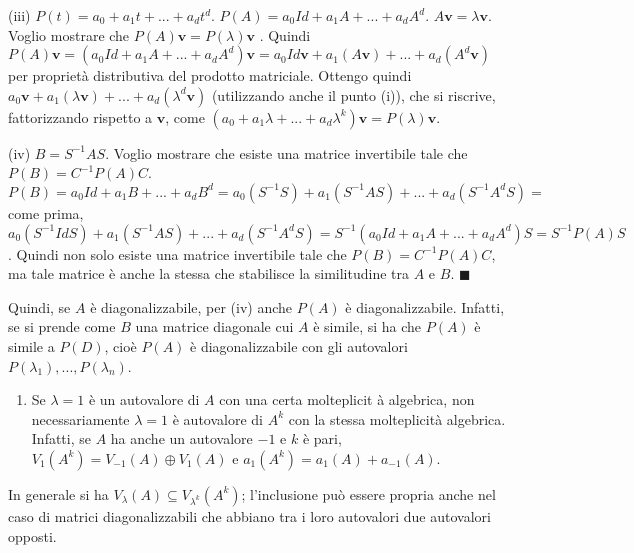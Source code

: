 \documentclass{article}
\begin{document}
(iii) $P\left( t\right) =a_{0}+a_{1}t+...+a_{d}t^{d}$. $P\left( A\right)
=a_{0}Id+a_{1}A+...+a_{d}A^{d}$. $A\mathbf{v=}\lambda \mathbf{v}$. Voglio
mostrare che $P\left( A\right) \mathbf{v}=P\left( \lambda \right) \mathbf{v}$%
. Quindi $P\left( A\right) \mathbf{v}=\left(
a_{0}Id+a_{1}A+...+a_{d}A^{d}\right) \mathbf{v}=a_{0}Id\mathbf{v}%
+a_{1}\left( A\mathbf{v}\right) +...+a_{d}\left( A^{d}\mathbf{v}\right) $
per propriet\`{a} distributiva del prodotto matriciale. Ottengo quindi $a_{0}%
\mathbf{v}+a_{1}\left( \lambda \mathbf{v}\right) +...+a_{d}\left( \lambda
^{d}\mathbf{v}\right) $ (utilizzando anche il punto (i)), che si riscrive,
fattorizzando rispetto a $\mathbf{v}$, come $\left( a_{0}+a_{1}\lambda
+...+a_{d}\lambda ^{k}\right) \mathbf{v}=P\left( \lambda \right) \mathbf{v}$.

(iv) $B=S^{-1}AS$. Voglio mostrare che esiste una matrice invertibile tale
che $P\left( B\right) =C^{-1}P\left( A\right) C$. $P\left( B\right)
=a_{0}Id+a_{1}B+...+a_{d}B^{d}=a_{0}\left( S^{-1}S\right) +a_{1}\left(
S^{-1}AS\right) +...+a_{d}\left( S^{-1}A^{d}S\right) =$ come prima, $%
a_{0}\left( S^{-1}IdS\right) +a_{1}\left( S^{-1}AS\right) +...+a_{d}\left(
S^{-1}A^{d}S\right) =S^{-1}\left( a_{0}Id+a_{1}A+...+a_{d}A^{d}\right)
S=S^{-1}P\left( A\right) S$. Quindi non solo esiste una matrice invertibile
tale che $P\left( B\right) =C^{-1}P\left( A\right) C$, ma tale matrice \`{e}
anche la stessa che stabilisce la similitudine tra $A$ e $B$. $\blacksquare $

Quindi, se $A$ \`{e} diagonalizzabile, per (iv) anche $P\left( A\right) $ 
\`{e} diagonalizzabile. Infatti, se si prende come $B$ una matrice diagonale
cui $A$ \`{e} simile, si ha che $P\left( A\right) $ \`{e} simile a $P\left(
D\right) $, cio\`{e} $P\left( A\right) $ \`{e} diagonalizzabile con gli
autovalori $P\left( \lambda _{1}\right) ,...,P\left( \lambda _{n}\right) $.

\begin{enumerate}
\item Se $\lambda =1$ \`{e} un autovalore di $A$ con una certa molteplicit%
\`{a} algebrica, non necessariamente $\lambda =1$ \`{e} autovalore di $A^{k}$
con la stessa molteplicit\`{a} algebrica. Infatti, se $A$ ha anche un
autovalore $-1$ e $k$ \`{e} pari, $V_{1}\left( A^{k}\right) =V_{-1}\left(
A\right) \oplus V_{1}\left( A\right) $ e $a_{1}\left( A^{k}\right)
=a_{1}\left( A\right) +a_{-1}\left( A\right) $.
\end{enumerate}

In generale si ha $V_{\lambda }\left( A\right) \subseteq V_{\lambda
^{k}}\left( A^{k}\right) $; l'inclusione pu\`{o} essere propria anche nel
caso di matrici diagonalizzabili che abbiano tra i loro autovalori due
autovalori opposti.
\end{document}
